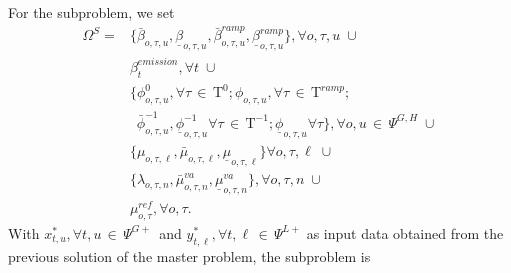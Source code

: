 \documentclass[final]{IEEEtran}
\newcommand{\myin}{\,{\in}\,}
\newcommand{\myeq}{\,{=}\,}
\newcommand{\mycup}{\,{\cup}\,}
\newcommand{\Tau}{\mathrm{T}}
\begin{document}
For the subproblem, we set
\begin{align*}
\Omega^{S} = &\{ \bar{\beta}_{o, \tau, u}, \underline{\beta}_{o, \tau, u}, \bar{\beta}_{o, \tau, u}^{ramp}, \underline{\beta}_{o, \tau, u}^{ramp} \}, \forall o, \tau, u \; \cup \\
&\beta_{t}^{emission}, \forall t \; \cup \\
&\{ \phi_{o, \tau, u}^{0}, \forall \tau \myin \Tau^0; \phi_{o, \tau, u}, \forall \tau \myin \Tau^{ramp}; \\
&\, \, \, \bar{\phi}_{o, \tau, u}^{-1}, \underline{\phi}_{o, \tau, u}^{-1} \forall \tau \myin \Tau^{-1}; \underline{\phi}_{o, \tau, u} \forall \tau \}, \forall o, u \myin \Psi^{G, H} \; \cup \\
&\{ \mu_{o, \tau, \ell}, \bar{\mu}_{o, \tau, \ell}, \underline{\mu}_{o, \tau, \ell} \} \forall o, \tau, \ell \; \cup \\
&\{ \lambda_{o, \tau, n}, \bar{\mu}^{va}_{o, \tau, n}, \underline{\mu}^{va}_{o, \tau, n} \}, \forall o, \tau, n \; \cup \\
&\mu^{ref}_{o, \tau}, \forall o, \tau.
\end{align*}
With $x_{t, u}^*, \forall t, u \myin \Psi^{G+}$ and $y_{t, \ell}^*, \forall t, \ell \myin \Psi^{L+}$ as input data obtained from the previous solution of the master problem, the subproblem is
\end{document}
